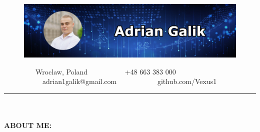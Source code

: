 \documentclass[10pt]{article}
\newcommand{\longline}{\rule{19.6cm}{1pt}}
\begin{document}
\begin{figure}[t]
    \hskip-1.55cm\includegraphics[scale=1.3625]{Galik_BANNER.png}
\end{figure}

\vspace*{-4ex}

\ \ \ \ \ \ \ \ \
\faMapMarker* Wroclaw, Poland \ \ \ \ \ \ \ \ \ \
\faPhone +48 663 383 000 \ \ \ \ \ \ \ \ \ \
\faEnvelope \ adrian1galik@gmail.com \ \ \ \ \ \ \ \ \ \
\faGithub \ github.com/Vexus1


\noindent \longline 
\\ \\
\noindent \fontsize{14pt}{14pt}\selectfont \textbf{\color{Violet}ABOUT ME:}
\fontsize{10pt}{10pt}\selectfont
\end{document}
